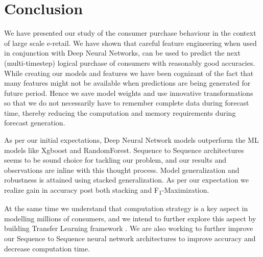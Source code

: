 \section{Conclusion}
\label{sec:conclusion}
We have presented our study of the consumer purchase behaviour in the context of large scale e-retail. 
We have shown that careful feature
engineering when used in conjunction with Deep Neural Networks, can be used
to predict the next (multi-timestep) logical purchase of consumers with reasonably good accuracies.
While creating our models and features we have been cognizant of
the fact that many features might not be available when predictions
are being generated for future period. Hence we save model weights and use innovative transformations 
so that we do not necessarily have to remember complete data during forecast time,
thereby reducing the computation and memory requirements during forecast generation.

As per our initial expectations, Deep Neural Network models outperform the ML models like Xgboost and RandomForest.
Sequence to Sequence architectures seems to be sound choice for tackling our problem, and our results and 
observations are inline with this thought process. Model generalization and robustness
is attained using stacked generalization. As per our expectation we realize gain in accuracy post both stacking
and F\textsubscript{1}-Maximization.

At the same time we understand that computation strategy is a key aspect in modelling
millions of consumers, and we intend to further explore this aspect by building 
Transfer Learning framework \cite{yosinski2014transferable}. We are also working to 
further improve our Sequence to Sequence neural network architectures to improve accuracy
and decrease computation time.
 

